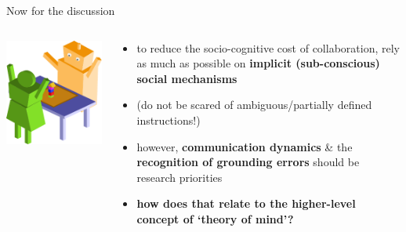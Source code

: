 \documentclass[compress]{beamer}
\begin{document}
\begin{frame}{Now for the discussion}

    \begin{columns}
        \begin{column}{0.4\linewidth}
            
            \begin{center}
                \includegraphics[width=0.9\linewidth]{joint-action-scenario-completed}
            \end{center}
        \end{column}
        \begin{column}{0.6\linewidth}
            \begin{itemize}
                \item<+-> to reduce the socio-cognitive cost of collaboration, rely as much
                    as possible on {\bf implicit (sub-conscious) social mechanisms}
                \item<+-> (do not be scared of ambiguous/partially defined
                    instructions!)
                \item<+-> however, {\bf communication dynamics} \& the {\bf recognition of grounding
                    errors} should be research priorities
                \item<+-> {\bf how does that relate to the higher-level concept of
                    `theory of mind'?}
            \end{itemize}

        \end{column}
    \end{columns}
\end{frame}
\end{document}
